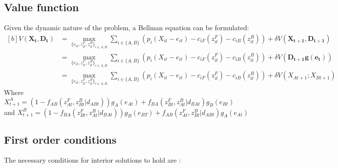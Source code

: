 \documentclass{article}
\begin{document}
\subsection{Value function}
Given the dynamic nature of the problem, a Bellman equation can be formulated: 
\begin{equation}
\begin{aligned}[b]
V(\mathbf{X_t,D_t}) &= \max_{ \{e_{it}, z_{it}^F, z_{it}^B\}_{i \in A,B} } \sum_{i \in \{A,B\}} \left( p_i(X_{it} - e_{it}) - c_{iF}(z_{it}^F) - c_{iB}(z_{it}^B) \right)+ \delta V\left(\mathbf{X_{t+1}, D_{t+1}}\right)\\
& = \max_{ \{e_{it}, z_{it}^F, z_{it}^B\}_{i \in A,B} } \sum_{i \in \{A,B\}} \left(p_i(X_{it} - e_{it}) - c_{iF}(z_{it}^F) - c_{iB}(z_{it}^B) \right) + \delta V(\mathbf{D_{t+1}g(e_t)})\\
&= \max_{ \{e_{it}, z_{it}^F, z_{it}^B\}_{i \in A,B} } \sum_{i \in \{A,B\}} \left( p_i(X_{it} - e_{it}) - c_{iF}(z_{it}^F) - c_{iB}(z_{it}^B)\right) + \delta V\left(X_{At+1}; X_{Bt+1} \right)
\end{aligned}
\end{equation}
Where $X_{t+1}^A = (1-f_{AB}(z^F_{At}, z^B_{Bt}| d_{ABt}))g_A(e_{At})+f_{BA}(z^F_{Bt}, z^B_{At}| d_{BAt})g_B(e_{Bt})$\\

and $X_{t+1}^B =(1 - f_{BA}(z^F_{Bt}, z^B_{At}| d_{BAt}))g_B(e_{BT}) +f_{AB}(z^F_{At}, z^B_{Bt}| d_{ABt})g_A(e_{At})$

\subsection{First order conditions}
The necessary conditions for interior solutions to hold are :
\end{document}

